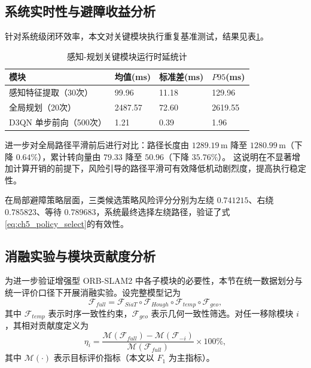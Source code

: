 \subsection{系统实时性与避障收益分析}
\label{subsec:ch5_realtime_benefit}

针对系统级闭环效率，本文对关键模块执行重复基准测试，结果见表\ref{tab:ch5_runtime_benchmark}。

\begin{table}[H]
	\centering
	\small
	\caption{感知-规划关键模块运行时延统计}
	\label{tab:ch5_runtime_benchmark}
	\begin{tabular}{p{}p{}p{}p{}}
		\toprule
		模块 & 均值(ms) & 标准差(ms) & $P95$(ms) \\
		\midrule
		感知特征提取（30次） & 99.96 & 11.18 & 129.96 \\
		全局规划（20次） & 2487.57 & 72.60 & 2619.55 \\
		D3QN 单步前向（500次） & 1.21 & 0.39 & 1.96 \\
		\bottomrule
	\end{tabular}
\end{table}

进一步对全局路径平滑前后进行对比：路径长度由 $1289.19\,\mathrm{m}$ 降至 $1280.99\,\mathrm{m}$（下降 $0.64\%$），累计转向量由 $79.33$ 降至 $50.96$（下降 $35.76\%$）。
这说明在不显著增加计算开销的前提下，风险引导的路径平滑可有效降低机动剧烈度，提高执行稳定性。

在局部避障策略层面，三类候选策略风险评分分别为左绕 $0.741215$、右绕 $0.785823$、等待 $0.789683$，系统最终选择左绕路径，验证了式\eqref{eq:ch5_policy_select}的有效性。

\subsection{消融实验与模块贡献度分析}
\label{subsec:ch5_ablation}

为进一步验证增强型 ORB-SLAM2 中各子模块的必要性，本节在统一数据划分与统一评价口径下开展消融实验。设完整模型记为
\begin{equation}
\mathcal{F}_{full}=\mathcal{F}_{SiaT}\circ\mathcal{F}_{Hough}\circ\mathcal{F}_{temp}\circ\mathcal{F}_{geo},
\label{eq:ch5_full_pipeline}
\end{equation}
其中 $\mathcal{F}_{temp}$ 表示时序一致性约束，$\mathcal{F}_{geo}$ 表示几何一致性筛选。对任一移除模块 $i$，其相对贡献度定义为
\begin{equation}
\eta_i=\frac{\mathcal{M}(\mathcal{F}_{full})-\mathcal{M}(\mathcal{F}_{-i})}{\mathcal{M}(\mathcal{F}_{full})}\times 100\%,
\label{eq:ch5_contribution}
\end{equation}
其中 $\mathcal{M}(\cdot)$ 表示目标评价指标（本文以 $F_1$ 为主指标）。

